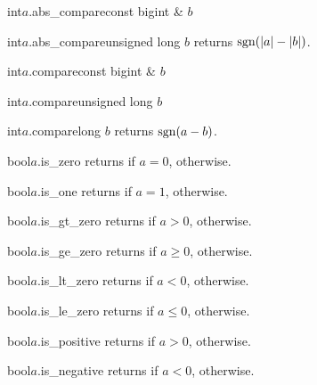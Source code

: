 \begin{cfcode}{int}{$a$.abs_compare}{const bigint & $b$}\end{cfcode}
\begin{cfcode}{int}{$a$.abs_compare}{unsigned long $b$}
  returns $\operatorname{sgn}(|a|-|b|)$.
\end{cfcode}

\begin{cfcode}{int}{$a$.compare}{const bigint & $b$}\end{cfcode}
\begin{cfcode}{int}{$a$.compare}{unsigned long $b$}\end{cfcode}
\begin{cfcode}{int}{$a$.compare}{long $b$}
  returns $\operatorname{sgn}(a-b)$.
\end{cfcode}

\begin{cfcode}{bool}{$a$.is_zero}{}
  returns \TRUE if $a = 0$, \FALSE otherwise.
\end{cfcode}

\begin{cfcode}{bool}{$a$.is_one}{}
  returns \TRUE if $a = 1$, \FALSE otherwise.
\end{cfcode}

\begin{cfcode}{bool}{$a$.is_gt_zero}{}
  returns \TRUE if $a > 0$, \FALSE otherwise.
\end{cfcode}

\begin{cfcode}{bool}{$a$.is_ge_zero}{}
  returns \TRUE if $a \geq 0$, \FALSE otherwise.
\end{cfcode}

\begin{cfcode}{bool}{$a$.is_lt_zero}{}
  returns \TRUE if $a < 0$, \FALSE otherwise.
\end{cfcode}

\begin{cfcode}{bool}{$a$.is_le_zero}{}
  returns \TRUE if $a \leq 0$, \FALSE otherwise.
\end{cfcode}

\begin{cfcode}{bool}{$a$.is_positive}{}
  returns \TRUE if $a > 0$, \FALSE otherwise.
\end{cfcode}

\begin{cfcode}{bool}{$a$.is_negative}{}
  returns \TRUE if $a < 0$, \FALSE otherwise.
\end{cfcode}

